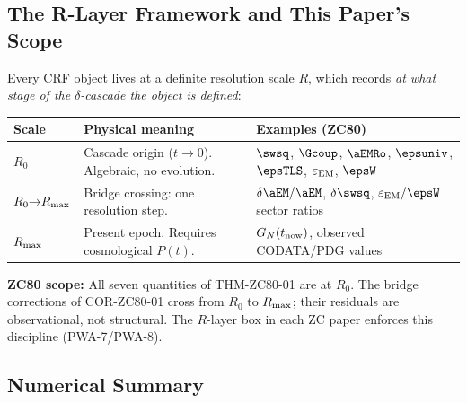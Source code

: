 \documentclass[12pt, a4paper]{article}
\renewcommand{\epsEM}{\varepsilon_{\rm EM}}
\begin{document}
\subsection{The R-Layer Framework and This Paper's Scope}
\label{sec:rlayer-scope}

\begin{keybox}[title={Resolution Scale ($R$-Layer) --- ZC80 Scope}]
Every CRF object lives at a definite resolution scale $R$,
which records \emph{at what stage of the $\delta$-cascade
the object is defined}:

\medskip
{\small\renewcommand{\arraystretch}{1.25}
\begin{tabular}{@{}p{2.2cm}p{5.0cm}p{5.0cm}@{}}
\toprule
\textbf{Scale} & \textbf{Physical meaning} & \textbf{Examples (ZC80)} \\
\midrule
$R_0$ & Cascade origin ($t\to 0$). Algebraic, no evolution. &
  $\swsq$, $\Gcoup$, $\aEMRo$, $\epsuniv$, $\epsTLS$, $\epsEM$, $\epsW$ \\[3pt]
$R_0{\to}R_{\rm max}$ & Bridge crossing: one resolution step. &
  $\delta\aEM/\aEM$, $\delta\swsq$, $\epsEM/\epsW$ sector ratios \\[3pt]
$R_{\rm max}$ & Present epoch. Requires cosmological $P(t)$. &
  $G_N(t_{\rm now})$, observed CODATA/PDG values \\
\bottomrule
\end{tabular}}

\medskip
\textbf{ZC80 scope:} All seven quantities of THM-ZC80-01 are
at $R_0$. The bridge corrections of COR-ZC80-01 cross from
$R_0$ to $R_{\rm max}$; their residuals are observational,
not structural. The $R$-layer box in each ZC paper enforces
this discipline (PWA-7/PWA-8).
\end{keybox}

\subsection{Numerical Summary}
\label{sec:numerical}
\end{document}
